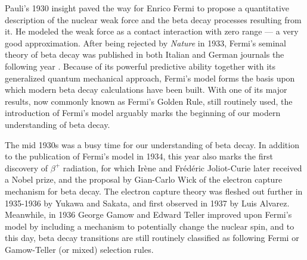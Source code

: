 Pauli's 1930 insight paved the way for Enrico Fermi to propose a quantitative description of the nuclear weak force and the beta decay processes resulting from it.  He modeled the weak force as a contact interaction with zero range --- a very good approximation.  After being rejected by \emph{Nature} in 1933, Fermi's seminal theory of beta decay was published in both Italian and German journals the following year \cite{AbrahamPais} \cite{Fermi1934Italian} \cite{Fermi1934German}.
Because of its powerful predictive ability together with its generalized quantum mechanical approach, Fermi's model forms the basis upon which modern beta decay calculations have been built.  With one of its major results, now commonly known as Fermi's Golden Rule, still routinely used, the introduction of Fermi's model arguably marks the beginning of our modern understanding of beta decay.

The mid 1930s was a busy time 
for our understanding of beta decay.  In addition to the publication of Fermi's model in 1934, this year also marks the first discovery of $\beta^+$ radiation, for which Irène and Frédéric Joliot-Curie later received a Nobel prize, and the proposal by Gian-Carlo Wick of the electron capture mechanism for beta decay.  
The electron capture theory was fleshed out further in 1935-1936 by Yukawa and Sakata, and first observed in 1937 by Luis Alvarez.  Meanwhile, in 1936 George Gamow and Edward Teller improved upon Fermi's model by including a mechanism to potentially change the nuclear spin\cite{GamowTeller}, and to this day, beta decay transitions are still routinely classified as following Fermi or Gamow-Teller (or mixed) selection rules.


